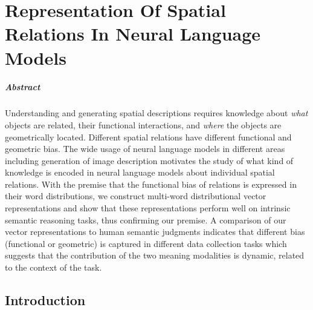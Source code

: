 
\chapter{Representation Of Spatial Relations In Neural Language Models}

\paragraph{Abstract}
Understanding and generating spatial descriptions requires knowledge about
\emph{what} objects are related, their functional interactions, and \emph{where} the objects are geometrically
located. Different spatial relations have different functional and geometric bias. The wide usage of neural language models in different areas including
generation of image description motivates the study of what kind of knowledge
is encoded in neural language models about individual spatial relations. With the premise
that the functional bias of relations is expressed in their word distributions, we construct multi-word
distributional vector representations and show that these representations
perform well on intrinsic semantic reasoning tasks, thus confirming our premise. A comparison of our vector representations to human
semantic judgments indicates that different bias (functional or
geometric) is captured in different data collection tasks which suggests that the contribution of the two meaning modalities is dynamic, related to the context of the task.



\section{Introduction}

